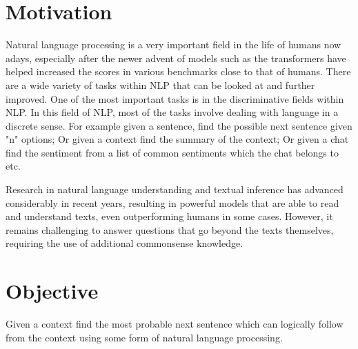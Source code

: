 \section{Motivation}
Natural language processing is a very important field in the life of humans now adays, especially after the newer advent of models such as the transformers have helped increased the scores in various benchmarks close to that of humans. There are a wide variety of tasks within NLP that can be looked at and further improved. One of the most important tasks is in the discriminative fields within NLP. In this field of NLP, most of the tasks involve dealing with language in a discrete sense. For example given a sentence, find the possible next sentence given "n" options; Or given a context find the summary of the context; Or given a chat find the sentiment from a list of common sentiments which the chat belongs to etc.

Research in natural language understanding and textual inference has advanced considerably in recent years, resulting in powerful models that are able to read and understand texts, even outperforming humans in some cases. However, it remains challenging to answer questions that go beyond the texts themselves, requiring the use of additional commonsense knowledge.

\section{Objective}
Given a context find the most probable next sentence which can logically follow from the context using some form of natural language processing.

